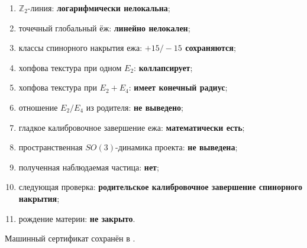 \begin{protocol}
\begin{enumerate}
 \item $\mathbb Z_2$-линия: \textbf{логарифмически нелокальна};
 \item точечный глобальный ёж: \textbf{линейно нелокален};
 \item классы спинорного накрытия ежа: \textbf{$+15/-15$ сохраняются};
 \item хопфова текстура при одном $E_2$: \textbf{коллапсирует};
 \item хопфова текстура при $E_2+E_4$: \textbf{имеет конечный радиус};
 \item отношение $E_2/E_4$ из родителя: \textbf{не выведено};
 \item гладкое калибровочное завершение ежа: \textbf{математически есть};
 \item пространственная $SO(3)$-динамика проекта: \textbf{не выведена};
 \item полученная наблюдаемая частица: \textbf{нет};
 \item следующая проверка:
 \textbf{родительское калибровочное завершение спинорного накрытия};
 \item рождение материи: \textbf{не закрыто}.
\end{enumerate}
\end{protocol}

Машинный сертификат сохранён в
.